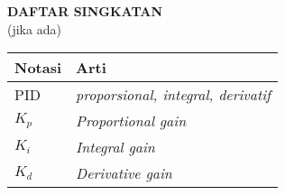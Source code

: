 \clearpage
{}
{}

\begin{center}
    \large \textbf{DAFTAR SINGKATAN} \\ (jika ada)
\end{center}
\vspace{3em}

\begin{center}
    \begin{tabularx}{0.8\textwidth} {
            >{\raggedright\arraybackslash}X
            >{\raggedright\arraybackslash}X}
        \hline
        \textbf{Notasi} & \textbf{Arti}                    \\
        \hline
        PID     & \textit{\textit{proporsional, integral, derivatif}}\\
        $K_{p}$ & \textit{Proportional gain}\\
        $K_{i}$ & \textit{Integral gain}\\
        $K_{d}$ & \textit{Derivative gain}\\
        \hline
    \end{tabularx}
\end{center}